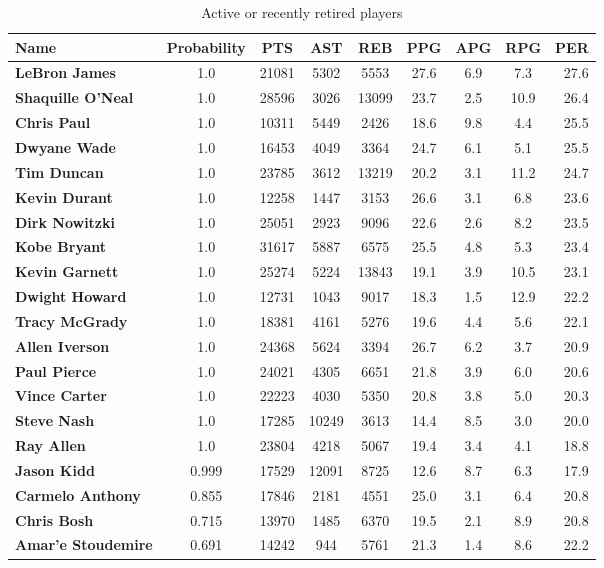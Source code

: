 \documentclass[paper=a4, fontsize=11pt]{scrartcl} %
\numberwithin{equation}{section} %
\numberwithin{figure}{section} %
\numberwithin{table}{section} %
\begin{document}
\begin{table}[thb]
\centering
\caption{\label{active}Active or recently retired players}
\begin{tabular}{l*{7}{c}r}
Name              & Probability & PTS & AST & REB & PPG  & APG & RPG & PER \\
\hline
\textbf{LeBron James} & 1.0 & 21081 & 5302 & 5553 & 27.6 & 6.9 & 7.3 & 27.6 \\
\textbf{Shaquille O'Neal} & 1.0 & 28596 & 3026 & 13099 & 23.7 & 2.5 & 10.9 & 26.4 \\
\textbf{Chris Paul} & 1.0 & 10311 & 5449 & 2426 & 18.6 & 9.8 & 4.4 & 25.5 \\
\textbf{Dwyane Wade} & 1.0 & 16453 & 4049 & 3364 & 24.7 & 6.1 & 5.1 & 25.5 \\
\textbf{Tim Duncan} & 1.0 & 23785 & 3612 & 13219 & 20.2 & 3.1 & 11.2 & 24.7 \\
\textbf{Kevin Durant} & 1.0 & 12258 & 1447 & 3153 & 26.6 & 3.1 & 6.8 & 23.6 \\
\textbf{Dirk Nowitzki} & 1.0 & 25051 & 2923 & 9096 & 22.6 & 2.6 & 8.2 & 23.5 \\
\textbf{Kobe Bryant} & 1.0 & 31617 & 5887 & 6575 & 25.5 & 4.8 & 5.3 & 23.4 \\
\textbf{Kevin Garnett} & 1.0 & 25274 & 5224 & 13843 & 19.1 & 3.9 & 10.5 & 23.1 \\
\textbf{Dwight Howard} & 1.0 & 12731 & 1043 & 9017 & 18.3 & 1.5 & 12.9 & 22.2 \\
\textbf{Tracy McGrady} & 1.0 & 18381 & 4161 & 5276 & 19.6 & 4.4 & 5.6 & 22.1 \\
\textbf{Allen Iverson} & 1.0 & 24368 & 5624 & 3394 & 26.7 & 6.2 & 3.7 & 20.9 \\
\textbf{Paul Pierce} & 1.0 & 24021 & 4305 & 6651 & 21.8 & 3.9 & 6.0 & 20.6 \\
\textbf{Vince Carter} & 1.0 & 22223 & 4030 & 5350 & 20.8 & 3.8 & 5.0 & 20.3 \\
\textbf{Steve Nash} & 1.0 & 17285 & 10249 & 3613 & 14.4 & 8.5 & 3.0 & 20.0 \\
\textbf{Ray Allen} & 1.0 & 23804 & 4218 & 5067 & 19.4 & 3.4 & 4.1 & 18.8 \\
\textbf{Jason Kidd} & 0.999 & 17529 & 12091 & 8725 & 12.6 & 8.7 & 6.3 & 17.9 \\
\textbf{Carmelo Anthony} & 0.855 & 17846 & 2181 & 4551 & 25.0 & 3.1 & 6.4 & 20.8 \\
\textbf{Chris Bosh} & 0.715 & 13970 & 1485 & 6370 & 19.5 & 2.1 & 8.9 & 20.8 \\
\textbf{Amar'e Stoudemire} & 0.691 & 14242 & 944 & 5761 & 21.3 & 1.4 & 8.6 & 22.2 \\

\end{tabular}
\end{table}
\end{document}
